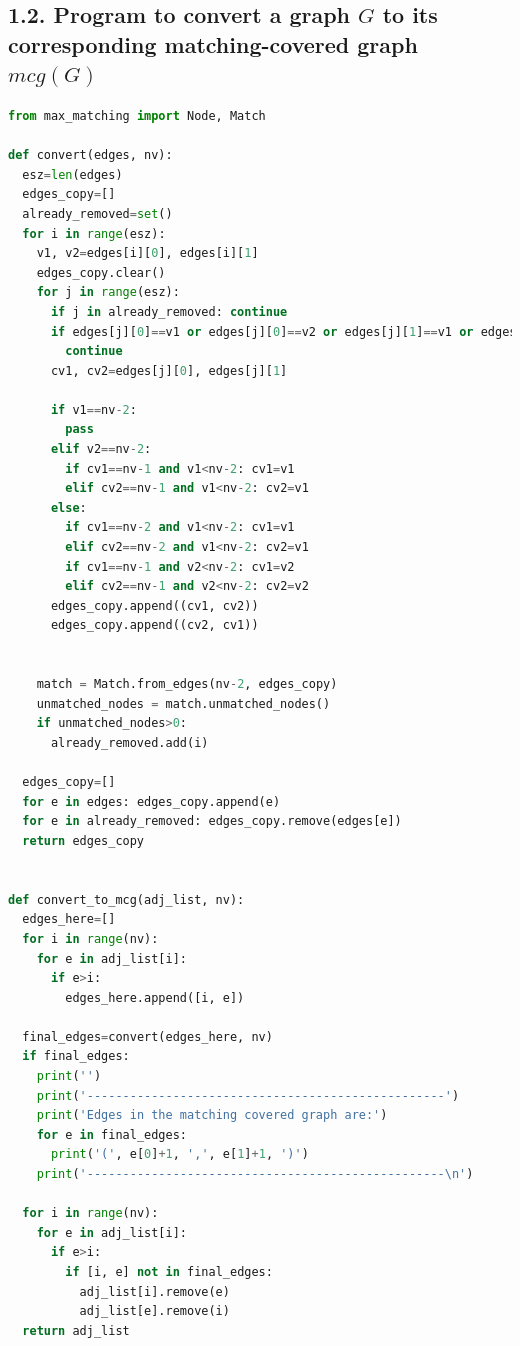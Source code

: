 \documentclass[11pt]{article}
\begin{document}
\subsection*{1.2. Program to convert a graph $G$ to its corresponding matching-covered graph $mcg(G)$}
\begin{lstlisting}[language=Python]
from max_matching import Node, Match

def convert(edges, nv):
  esz=len(edges)
  edges_copy=[]
  already_removed=set()
  for i in range(esz):
    v1, v2=edges[i][0], edges[i][1]
    edges_copy.clear()
    for j in range(esz):
      if j in already_removed: continue
      if edges[j][0]==v1 or edges[j][0]==v2 or edges[j][1]==v1 or edges[j][1]==v2:
        continue
      cv1, cv2=edges[j][0], edges[j][1]

      if v1==nv-2:
        pass
      elif v2==nv-2:
        if cv1==nv-1 and v1<nv-2: cv1=v1
        elif cv2==nv-1 and v1<nv-2: cv2=v1
      else:        
        if cv1==nv-2 and v1<nv-2: cv1=v1
        elif cv2==nv-2 and v1<nv-2: cv2=v1
        if cv1==nv-1 and v2<nv-2: cv1=v2
        elif cv2==nv-1 and v2<nv-2: cv2=v2
      edges_copy.append((cv1, cv2))
      edges_copy.append((cv2, cv1))


    match = Match.from_edges(nv-2, edges_copy)
    unmatched_nodes = match.unmatched_nodes()
    if unmatched_nodes>0:
      already_removed.add(i)

  edges_copy=[]
  for e in edges: edges_copy.append(e)
  for e in already_removed: edges_copy.remove(edges[e])
  return edges_copy


def convert_to_mcg(adj_list, nv):
  edges_here=[]
  for i in range(nv):
    for e in adj_list[i]:
      if e>i:
        edges_here.append([i, e])

  final_edges=convert(edges_here, nv)
  if final_edges:
    print('')
    print('--------------------------------------------------')
    print('Edges in the matching covered graph are:')
    for e in final_edges:
      print('(', e[0]+1, ',', e[1]+1, ')')
    print('--------------------------------------------------\n')

  for i in range(nv):
    for e in adj_list[i]:
      if e>i:
        if [i, e] not in final_edges:
          adj_list[i].remove(e)
          adj_list[e].remove(i)
  return adj_list
\end{lstlisting}
\end{document}
